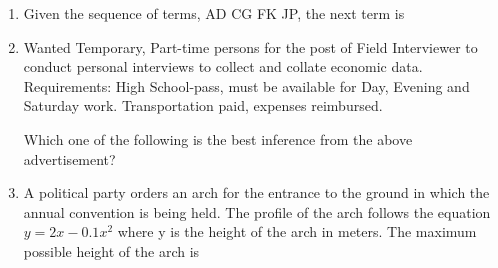 \documentclass[journal,11pt,onecolumn]{IEEEtran}
\begin{document}
\begin{enumerate}[resume]

    \item Given the sequence of terms, AD CG FK JP, the next term is

          \begin{enumerate}
          \end{enumerate}

    \item Wanted Temporary, Part-time persons for the post of Field Interviewer to conduct personal interviews to collect and collate economic data. Requirements: High School-pass, must be available for Day, Evening and Saturday work. Transportation paid, expenses reimbursed.

          Which one of the following is the best inference from the above advertisement?

          \begin{enumerate}
          \end{enumerate}

    \item A political party orders an arch for the entrance to the ground in which the annual convention is being held. The profile of the arch follows the equation \(y = 2x - 0.1x^2\) where y is the height of the arch in meters. The maximum possible height of the arch is

          \begin{enumerate}
          \end{enumerate}


\end{enumerate}
\end{document}
